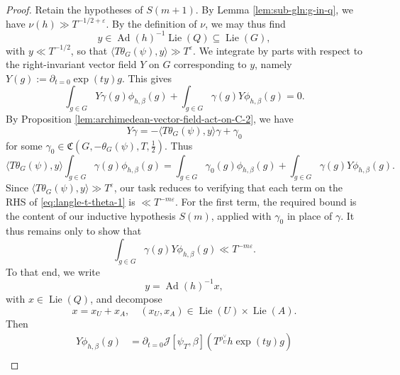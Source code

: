 \documentclass[reqno]{amsart}
\DeclareMathOperator{\Ad}{Ad}
\def\eps{\varepsilon}
\DeclareMathOperator{\Lie}{Lie}
\theoremstyle{plain} \newtheorem{theorem} {Theorem}
\theoremstyle{definition} \newtheorem{definition} [theorem] {Definition}
\theoremstyle{itplain} %
\numberwithin{equation}{section}
\numberwithin{theorem}{section}
\begin{document}
\begin{proof}
  Retain the hypotheses of $S(m+1)$.  By Lemma \ref{lem:sub-gln:g-in-q}, we have $\nu(h) \gg T^{-1/2+\eps}$.  By the definition of $\nu$, we may thus find
  \begin{equation*}
    y \in \Ad(h)^{-1} \Lie(Q) \subseteq \Lie(G),
  \end{equation*}
  with $y \ll T^{-1/2}$, so that $\langle T \theta_G(\psi), y \rangle \gg T^{\eps}$.  We integrate by parts with respect to the right-invariant vector field $Y$ on $G$ corresponding to $y$, namely $Y(g) := \partial_{t=0} \exp(t y) g$.  This gives
  \begin{equation*}
    \int_{g \in G} Y \gamma(g) \phi_{h, \beta } (g)
    +
    \int_{g \in G} \gamma(g) Y \phi_{h, \beta } (g) = 0.
  \end{equation*}
  By Proposition \ref{lem:archimedean-vector-field-act-on-C-2}, we have
  \begin{equation*}
    Y \gamma = -\langle T \theta_G(\psi), y \rangle \gamma + \gamma_0
  \end{equation*}
  for some $\gamma_0 \in \mathfrak{C}(G,-\theta_G(\psi),T,\tfrac{1}{2})$.  Thus
  \begin{equation}\label{eq:langle-t-theta-1}
    \langle T \theta_G(\psi) , y \rangle \int _{g \in G} \gamma(g) \phi_{h,\beta}(g)
    =
    \int _{g \in G} \gamma_0(g) \phi_{h,\beta}(g) + \int _{g \in G} \gamma(g) Y \phi_{h,\beta}(g).
  \end{equation}
  Since $\langle T \theta_G(\psi), y \rangle \gg T^{\eps}$, our task reduces to verifying that each term on the RHS of \eqref{eq:langle-t-theta-1} is $\ll T^{-m \eps}$.  For the first term, the required bound is the content of our inductive hypothesis $S(m)$, applied with $\gamma_0$ in place of $\gamma$.  It thus remains only to show that
  \begin{equation}\label{eq:int-_g-in-1-9}
    \int _{g \in G} \gamma(g) Y \phi_{h,\beta}(g) \ll T^{-m \eps}.
  \end{equation}
  To that end, we write
  \begin{equation*}
    y = \Ad(h)^{-1} x,
  \end{equation*}
  with $x \in \Lie(Q)$, and decompose
  \begin{equation*}
    x = x_U + x_A, \quad
    (x_U, x_A) \in \Lie(U)  \times \Lie(A).
  \end{equation*}
  Then
  \begin{align*}
    Y \phi_{h,\beta}(g)
    &= \partial_{t=0} \mathcal{J}[\psi_T,\beta](T^{\rho_U^\vee} h \exp(t y) g) \\

\end{align*}
\end{proof}
\end{document}
